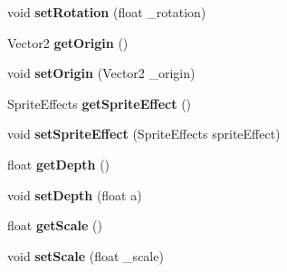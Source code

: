 \begin{DoxyCompactItemize}
\item 
\hypertarget{class_tile_engine_1_1_tile_aaa04418a5a8dcc9bebb87ac53ee278db}{void {\bfseries set\-Rotation} (float \-\_\-rotation)}\label{d6/d07/class_tile_engine_1_1_tile_aaa04418a5a8dcc9bebb87ac53ee278db}

\item 
\hypertarget{class_tile_engine_1_1_tile_a6bd3dcc3dd10b029cd85088658106014}{Vector2 {\bfseries get\-Origin} ()}\label{d6/d07/class_tile_engine_1_1_tile_a6bd3dcc3dd10b029cd85088658106014}

\item 
\hypertarget{class_tile_engine_1_1_tile_ae91093977a19c40af47893a383b21a7b}{void {\bfseries set\-Origin} (Vector2 \-\_\-origin)}\label{d6/d07/class_tile_engine_1_1_tile_ae91093977a19c40af47893a383b21a7b}

\item 
\hypertarget{class_tile_engine_1_1_tile_a0c3b54ce1eb5944056e03a50a0a4347b}{Sprite\-Effects {\bfseries get\-Sprite\-Effect} ()}\label{d6/d07/class_tile_engine_1_1_tile_a0c3b54ce1eb5944056e03a50a0a4347b}

\item 
\hypertarget{class_tile_engine_1_1_tile_a4e99f01cfc6d9d48a588891bd0fd1eaa}{void {\bfseries set\-Sprite\-Effect} (Sprite\-Effects sprite\-Effect)}\label{d6/d07/class_tile_engine_1_1_tile_a4e99f01cfc6d9d48a588891bd0fd1eaa}

\item 
\hypertarget{class_tile_engine_1_1_tile_a1a7950d049cdda64f4d6c8d3ea9c6dd9}{float {\bfseries get\-Depth} ()}\label{d6/d07/class_tile_engine_1_1_tile_a1a7950d049cdda64f4d6c8d3ea9c6dd9}

\item 
\hypertarget{class_tile_engine_1_1_tile_aa6bd1b1cf9ecacf8a31e77aa924fa46e}{void {\bfseries set\-Depth} (float a)}\label{d6/d07/class_tile_engine_1_1_tile_aa6bd1b1cf9ecacf8a31e77aa924fa46e}

\item 
\hypertarget{class_tile_engine_1_1_tile_adb8ab716f690fd85f35ca86d2317cb2d}{float {\bfseries get\-Scale} ()}\label{d6/d07/class_tile_engine_1_1_tile_adb8ab716f690fd85f35ca86d2317cb2d}

\item 
\hypertarget{class_tile_engine_1_1_tile_af2da0c551f70034307d1d9e9f5cc1301}{void {\bfseries set\-Scale} (float \-\_\-scale)}\label{d6/d07/class_tile_engine_1_1_tile_af2da0c551f70034307d1d9e9f5cc1301}

\end{DoxyCompactItemize}
